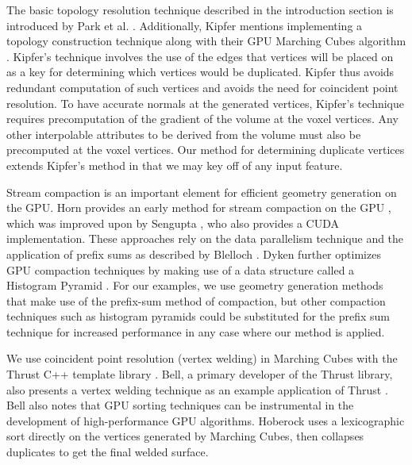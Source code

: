 \documentclass[10pt,journal,cspaper,compsoc]{IEEEtran}
\begin{document}
The basic topology resolution technique described in the introduction section is
introduced by Park et al. \cite{Park}. Additionally, Kipfer mentions
implementing a topology construction technique along with their GPU
Marching Cubes algorithm \cite{Kipfer2005}. Kipfer's technique involves the use of the edges that vertices 
will be placed on as a key for determining which vertices would be duplicated. Kipfer 
thus avoids redundant computation of such vertices and avoids the need for coincident 
point resolution. To have accurate normals at the generated vertices, Kipfer's technique
requires precomputation of the gradient of the volume at the voxel vertices. Any other
interpolable attributes to be derived from the volume must also be precomputed at the
voxel vertices. Our method for determining duplicate vertices extends Kipfer's method in that
we may key off of any input feature.

Stream compaction is an important element for efficient geometry generation on the GPU.
Horn provides an early method for stream compaction on the GPU \cite{Horn2005}, which
was improved upon by Sengupta \cite{Sengupta2007}, who also provides a CUDA implementation. 
These approaches rely on the data parallelism technique and the application of prefix sums 
as described by Blelloch \cite{Blelloch1990}. Dyken further optimizes
GPU compaction techniques by making use of a data structure called a Histogram Pyramid \cite{Dyken2008}.
For our examples, we use geometry generation methods that make use of the prefix-sum
method of compaction, but other compaction techniques such as histogram pyramids could be
substituted for the prefix sum technique for increased performance in any case where our method is applied.

We use coincident point resolution (vertex welding) in Marching Cubes with the Thrust
C++ template library \cite{Bell2012}. Bell, a primary
developer of the Thrust library, also presents a vertex welding technique as an
example application of Thrust \cite{Bell2010}. Bell also notes that GPU sorting techniques can
be instrumental in the development of high-performance GPU algorithms. Hoberock uses a
lexicographic sort directly on the vertices generated by Marching Cubes, then collapses 
duplicates to get the final welded surface.
\end{document}
